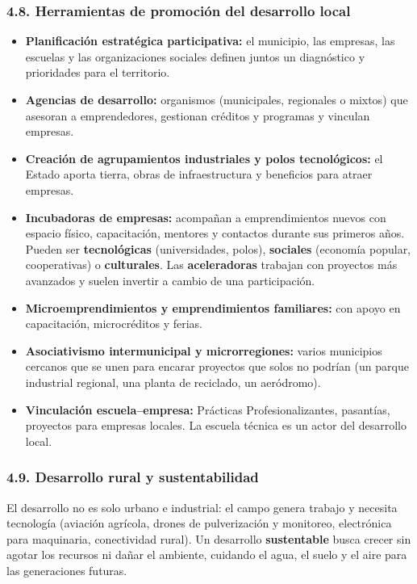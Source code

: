 \subsubsection*{4.8. Herramientas de promoción del desarrollo local}
\begin{itemize}
  \item \textbf{Planificación estratégica participativa:} el municipio, las empresas, las
        escuelas y las organizaciones sociales definen juntos un diagnóstico y prioridades
        para el territorio.
  \item \textbf{Agencias de desarrollo:} organismos (municipales, regionales o mixtos) que
        asesoran a emprendedores, gestionan créditos y programas y vinculan empresas.
  \item \textbf{Creación de agrupamientos industriales y polos tecnológicos:} el Estado aporta
        tierra, obras de infraestructura y beneficios para atraer empresas.
  \item \textbf{Incubadoras de empresas:} acompañan a emprendimientos nuevos con espacio
        físico, capacitación, mentores y contactos durante sus primeros años. Pueden ser
        \textbf{tecnológicas} (universidades, polos), \textbf{sociales} (economía popular,
        cooperativas) o \textbf{culturales}. Las \textbf{aceleradoras} trabajan con proyectos
        más avanzados y suelen invertir a cambio de una participación.
  \item \textbf{Microemprendimientos y emprendimientos familiares:} con apoyo en capacitación,
        microcréditos y ferias.
  \item \textbf{Asociativismo intermunicipal y microrregiones:} varios municipios cercanos
        que se unen para encarar proyectos que solos no podrían (un parque industrial
        regional, una planta de reciclado, un aeródromo).
  \item \textbf{Vinculación escuela--empresa:} Prácticas Profesionalizantes, pasantías,
        proyectos para empresas locales. La escuela técnica es un actor del desarrollo local.
\end{itemize}

\subsubsection*{4.9. Desarrollo rural y sustentabilidad}
El desarrollo no es solo urbano e industrial: el campo genera trabajo y necesita tecnología
(aviación agrícola, drones de pulverización y monitoreo, electrónica para maquinaria,
conectividad rural). Un desarrollo \textbf{sustentable} busca crecer sin agotar los recursos
ni dañar el ambiente, cuidando el agua, el suelo y el aire para las generaciones futuras.
